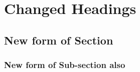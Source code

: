 \documentclass{book}
\begin{document}
\chapter{Changed Headings}
\section{New form of Section}
\subsection{New form of Sub-section also}
\end{document}
